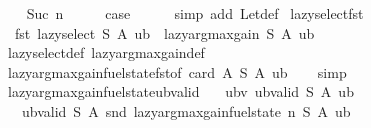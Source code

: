 \begin{isabellebody}
\isamarkupfalse%
\isanewline
\ \ \isamarkupfalse%
\ {\isacharparenleft}{\kern0pt}Suc\ n{\isacharparenright}{\kern0pt}\isanewline
\ \ \isamarkupfalse%
\ \isamarkupfalse%
\ {\isacharquery}{\kern0pt}case\isanewline
\ \ \ \ \isamarkupfalse%
\ {\isacharparenleft}{\kern0pt}simp\ add{\isacharcolon}{\kern0pt}\ Let{\isacharunderscore}{\kern0pt}def{\isacharparenright}{\kern0pt}\isanewline
{}\isamarkupfalse%
%
\endisatagproof
{\isafoldproof}%
%
\isadelimproof
\isanewline
%
\endisadelimproof
\isanewline
{}\isamarkupfalse%
\ lazy{\isacharunderscore}{\kern0pt}select{\isacharunderscore}{\kern0pt}fst{\isacharcolon}{\kern0pt}\isanewline
\ \ {\isachardoublequoteopen}fst\ {\isacharparenleft}{\kern0pt}lazy{\isacharunderscore}{\kern0pt}select\ S\ A\ ub{\isacharparenright}{\kern0pt}\ {\isacharequal}{\kern0pt}\ lazy{\isacharunderscore}{\kern0pt}argmax{\isacharunderscore}{\kern0pt}gain\ S\ A\ ub{\isachardoublequoteclose}\isanewline
%
\isadelimproof
\ \ %
\endisadelimproof
%
\isatagproof
{}\isamarkupfalse%
\ lazy{\isacharunderscore}{\kern0pt}select{\isacharunderscore}{\kern0pt}def\ lazy{\isacharunderscore}{\kern0pt}argmax{\isacharunderscore}{\kern0pt}gain{\isacharunderscore}{\kern0pt}def\isanewline
\ \ \isamarkupfalse%
\ lazy{\isacharunderscore}{\kern0pt}argmax{\isacharunderscore}{\kern0pt}gain{\isacharunderscore}{\kern0pt}fuel{\isacharunderscore}{\kern0pt}state{\isacharunderscore}{\kern0pt}fst{\isacharbrackleft}{\kern0pt}of\ {\isachardoublequoteopen}card\ A{\isachardoublequoteclose}\ S\ A\ ub{\isacharbrackright}{\kern0pt}\isanewline
\ \ \isamarkupfalse%
\ simp%
\endisatagproof
{\isafoldproof}%
%
\isadelimproof
\isanewline
%
\endisadelimproof
\isanewline
{}\isamarkupfalse%
\ lazy{\isacharunderscore}{\kern0pt}argmax{\isacharunderscore}{\kern0pt}gain{\isacharunderscore}{\kern0pt}fuel{\isacharunderscore}{\kern0pt}state{\isacharunderscore}{\kern0pt}ub{\isacharunderscore}{\kern0pt}valid{\isacharcolon}{\kern0pt}\isanewline
\ \ \ ubv{\isacharcolon}{\kern0pt}\ {\isachardoublequoteopen}ub{\isacharunderscore}{\kern0pt}valid\ S\ A\ ub{\isachardoublequoteclose}\isanewline
\ \ \ {\isachardoublequoteopen}ub{\isacharunderscore}{\kern0pt}valid\ S\ A\ {\isacharparenleft}{\kern0pt}snd\ {\isacharparenleft}{\kern0pt}lazy{\isacharunderscore}{\kern0pt}argmax{\isacharunderscore}{\kern0pt}gain{\isacharunderscore}{\kern0pt}fuel{\isacharunderscore}{\kern0pt}state\ n\ S\ A\ ub{\isacharparenright}{\kern0pt}{\isacharparenright}{\kern0pt}{\isachardoublequoteclose}\isanewline

\end{isabellebody}

